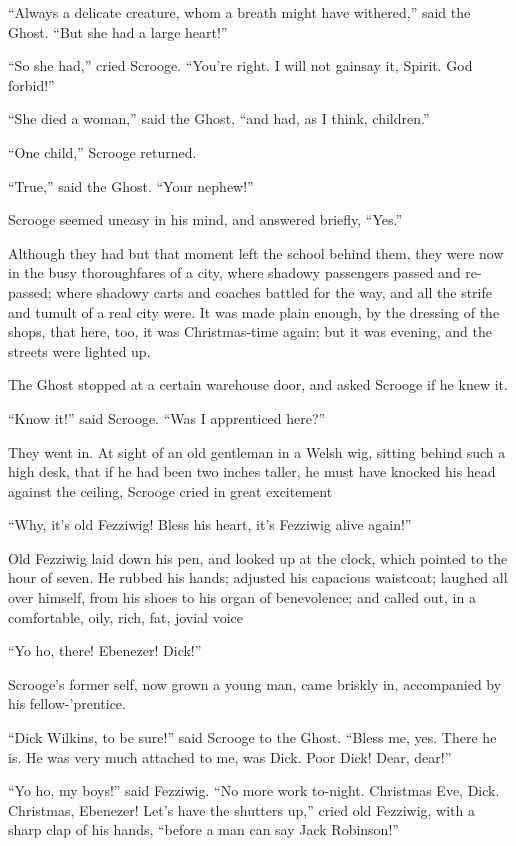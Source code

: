 \documentclass[paper=5.5in:8.5in,BCOR=10mm,twoside,DIV=15,12pt,usegeometry,openany]{scrbook} %
\begin{document}
\enquote{Always a delicate creature, whom a breath might have withered,} said the Ghost. \enquote{But she had a large heart!}

\enquote{So she had,} cried Scrooge. \enquote{You're right. I will not gainsay it, Spirit. God forbid!}

\enquote{She died a woman,} said the Ghost, \enquote{and had, as I think, children.}

\enquote{One child,} Scrooge returned.

\enquote{True,} said the Ghost. \enquote{Your nephew!}

Scrooge seemed uneasy in his mind, and answered briefly, \enquote{Yes.}

Although they had but that moment left the school behind them, they were now in the busy thoroughfares of a city, where shadowy passengers passed and re-passed; where shadowy carts and coaches battled for the way, and all the strife and tumult of a real city were. It was made plain enough, by the dressing of the shops, that here, too, it was Christmas-time again; but it was evening, and the streets were lighted up.

The Ghost stopped at a certain warehouse door, and asked Scrooge if he knew it.

\enquote{Know it!} said Scrooge. \enquote{Was I apprenticed here?}

They went in. At sight of an old gentleman in a Welsh wig, sitting behind such a high desk, that if he had been two inches taller, he must have knocked his head against the ceiling, Scrooge cried in great excitement\textemdash 

\enquote{Why, it's old Fezziwig! Bless his heart, it's Fezziwig alive again!}

Old Fezziwig laid down his pen, and looked up at the clock, which pointed to the hour of seven. He rubbed his hands; adjusted his capacious waistcoat; laughed all over himself, from his shoes to his organ of benevolence; and called out, in a comfortable, oily, rich, fat, jovial voice\textemdash 

\enquote{Yo ho, there! Ebenezer! Dick!}

Scrooge's former self, now grown a young man, came briskly in, accompanied by his fellow-'prentice.

\enquote{Dick Wilkins, to be sure!} said Scrooge to the Ghost. \enquote{Bless me, yes. There he is. He was very much attached to me, was Dick. Poor Dick! Dear, dear!}

\enquote{Yo ho, my boys!} said Fezziwig. \enquote{No more work to-night. Christmas Eve, Dick. Christmas, Ebenezer! Let's have the shutters up,} cried old Fezziwig, with a sharp clap of his hands, \enquote{before a man can say Jack Robinson!}
\end{document}
